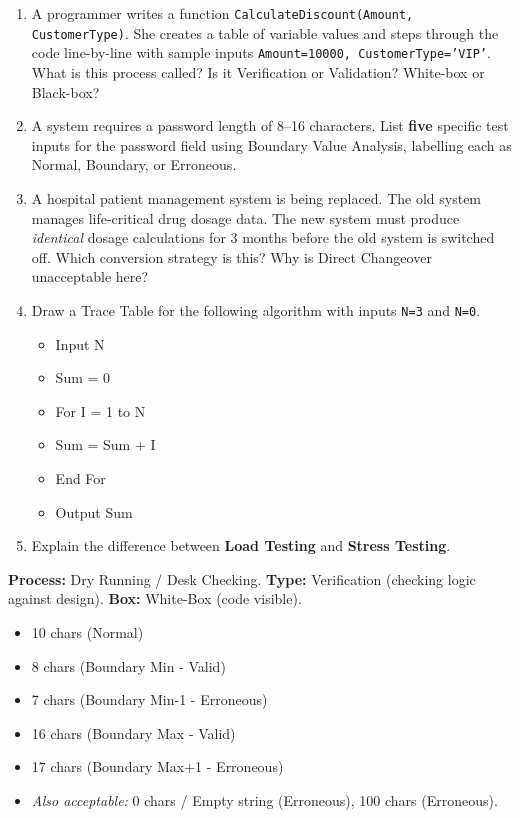 \documentclass[11pt]{article}
\begin{document}
\begin{exercice}
\begin{enumerate}
    \item A programmer writes a function \texttt{CalculateDiscount(Amount, CustomerType)}. She creates a table of variable values and steps through the code line-by-line with sample inputs \texttt{Amount=10000, CustomerType='VIP'}. What is this process called? Is it Verification or Validation? White-box or Black-box?
    \item A system requires a password length of 8--16 characters. List \textbf{five} specific test inputs for the password field using Boundary Value Analysis, labelling each as Normal, Boundary, or Erroneous.
    \item A hospital patient management system is being replaced. The old system manages life-critical drug dosage data. The new system must produce \emph{identical} dosage calculations for 3 months before the old system is switched off. Which conversion strategy is this? Why is Direct Changeover unacceptable here?
    \item Draw a Trace Table for the following algorithm with inputs \texttt{N=3} and \texttt{N=0}.
    \begin{itemize}
        \item Input N
        \item Sum = 0
        \item For I = 1 to N
        \item \quad Sum = Sum + I
        \item End For
        \item Output Sum
    \end{itemize}
    \item Explain the difference between \textbf{Load Testing} and \textbf{Stress Testing}.
\end{enumerate}
\end{exercice}

\begin{corrige}[Exercise 1]
\textbf{Process:} Dry Running / Desk Checking. \textbf{Type:} Verification (checking logic against design). \textbf{Box:} White-Box (code visible).
\end{corrige}

\begin{corrige}[Exercise 2]
\begin{itemize}
    \item 10 chars (Normal)
    \item 8 chars (Boundary Min - Valid)
    \item 7 chars (Boundary Min-1 - Erroneous)
    \item 16 chars (Boundary Max - Valid)
    \item 17 chars (Boundary Max+1 - Erroneous)
    \item \textit{Also acceptable:} 0 chars / Empty string (Erroneous), 100 chars (Erroneous).
\end{itemize}
\end{corrige}
\end{document}
